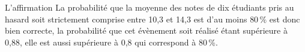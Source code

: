 \documentclass[10pt]{article}
\begin{document}
\begin{enumerate}
\begin{enumerate}
		L'affirmation \og La probabilité que la moyenne des notes de dix étudiants pris au hasard soit strictement comprise entre 10,3 et 14,3 est d'au moins $80\,\%$ \fg{} est donc bien correcte, la probabilité que cet évènement soit réalisé étant supérieure à 0,88, elle est aussi supérieure à 0,8 qui correspond à 80\,\%.
	\end{enumerate}
\end{enumerate}

\medskip
\end{document}
